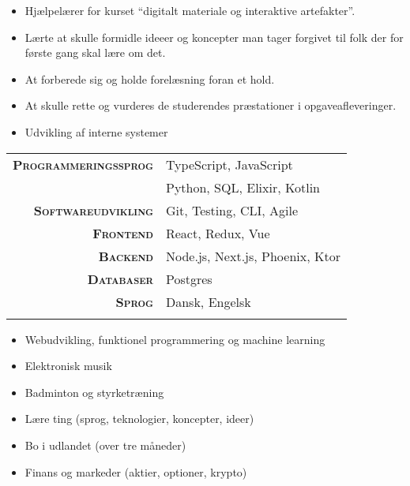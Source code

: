 \documentclass[10pt,a4paper,ragged2e,dvipsnames]{altacv}
\begin{document}
    \divider

    \begin{itemize}
      \item Hjælpelærer for kurset ``digitalt materiale og interaktive artefakter''.
      \item Lærte at skulle formidle ideeer og koncepter man tager forgivet til folk der for første gang skal lære om det.
      \item At forberede sig og holde forelæsning foran et hold.
      \item At skulle rette og vurderes de studerendes præstationer i opgaveafleveringer.
    \end{itemize}

    \divider

    \begin{itemize}
      \item Udvikling af interne systemer
    \end{itemize}

    \smallskip
    \begin{tabular}{rl}
      \makeatletter
      \textsc{\textbf{Programmeringssprog}} & TypeScript, JavaScript \\
      & Python, SQL, Elixir, Kotlin \\
      \textsc{\textbf{Softwareudvikling}} & Git, Testing, CLI, Agile \\
      \textsc{\textbf{Frontend}} & React, Redux, Vue \\
      \textsc{\textbf{Backend}} & Node.js, Next.js, Phoenix, Ktor \\
      \textsc{\textbf{Databaser}} & Postgres \\
      \textsc{\textbf{Sprog}} & Dansk, Engelsk \\
      \makeatother
    \end{tabular}

    \smallskip
    \begin{itemize}
      \item Webudvikling, funktionel programmering og machine learning
      \item Elektronisk musik
      \item Badminton og styrketræning
      \item Lære ting (sprog, teknologier, koncepter, ideer)
      \item Bo i udlandet (over tre måneder)
      \item Finans og markeder (aktier, optioner, krypto)
    \end{itemize}
\end{document}
